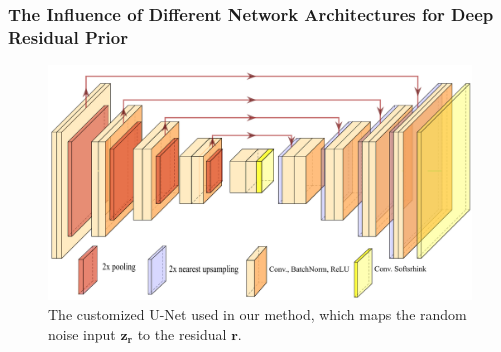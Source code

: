 \documentclass[10pt,twocolumn,letterpaper]{article}
\begin{document}
	\subsubsection{The Influence of Different Network Architectures for Deep Residual Prior} 
	\begin{figure}[t]
		\centering
		\includegraphics[scale=0.41]{Unet1.pdf}
		\caption{The customized U-Net used in our method, which maps the random noise input $\bm{z_r}$ to the residual $\bm r$.} 
		\label{struc}
	\end{figure}
\end{document}
